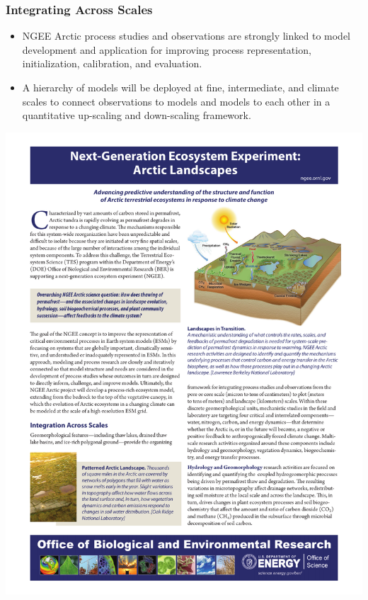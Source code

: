 \begin{frame}
 \frametitle{Integrating Across Scales}
 \begin{itemize}\small
  \item NGEE Arctic process studies and observations are strongly linked to model development and application for improving process representation, initialization, calibration, and evaluation.
  \item A hierarchy of models will be deployed at fine, intermediate, and climate scales to connect observations to models and models to each other in a quantitative up-scaling and down-scaling framework.
\end{itemize}
\begin{center}
  \includegraphics[width=\textwidth,page=2,trim=0.58in 7.75in 0.58in 0.325in,clip=TRUE]{ngee_figures/TES-ArcticEco_07-25-2012d.pdf} \\
 \end{center}
\end{frame}
%
%
